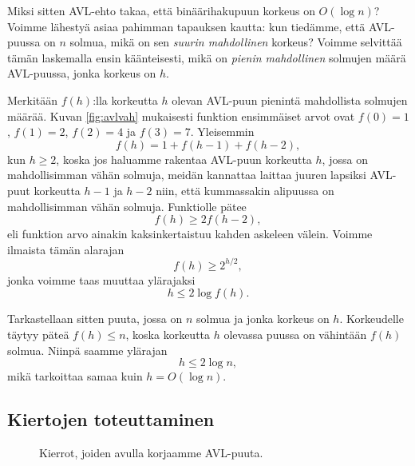Miksi sitten AVL-ehto takaa, että binäärihakupuun korkeus
on $O(\log n)$?
Voimme lähestyä asiaa pahimman tapauksen kautta:
kun tiedämme, että AVL-puussa on $n$ solmua,
mikä on sen \emph{suurin mahdollinen} korkeus?
Voimme selvittää tämän laskemalla ensin käänteisesti,
mikä on \emph{pienin mahdollinen} solmujen määrä
AVL-puussa, jonka korkeus on $h$.

Merkitään $f(h)$:lla korkeutta $h$ olevan AVL-puun
pienintä mahdollista solmujen määrää.
Kuvan \ref{fig:avlvah} mukaisesti funktion ensimmäiset arvot
ovat $f(0)=1$, $f(1)=2$, $f(2)=4$ ja $f(3)=7$.
Yleisemmin
\[f(h)=1+f(h-1)+f(h-2),\]
kun $h \ge 2$, koska jos haluamme rakentaa AVL-puun korkeutta $h$,
jossa on mahdollisimman vähän solmuja,
meidän kannattaa laittaa juuren lapsiksi AVL-puut
korkeutta $h-1$ ja $h-2$ niin,
että kummassakin alipuussa on mahdollisimman vähän solmuja.
Funktiolle pätee
\[f(h) \ge 2 f(h-2),\]
eli funktion arvo ainakin kaksinkertaistuu kahden askeleen välein.
Voimme ilmaista tämän alarajan
\[f(h) \ge 2^{h/2},\]
jonka voimme taas muuttaa ylärajaksi
\[ h \le 2 \log f(h).\]

Tarkastellaan sitten puuta, jossa on $n$ solmua
ja jonka korkeus on $h$.
Korkeudelle täytyy päteä $f(h) \le n$,
koska korkeutta $h$ olevassa puussa on vähintään $f(h)$ solmua.
Niinpä saamme ylärajan
\[h \le 2 \log n,\]
mikä tarkoittaa samaa kuin $h = O(\log n)$.

\subsection{Kiertojen toteuttaminen}

\begin{figure}
\center
{}
\caption{Kierrot, joiden avulla korjaamme AVL-puuta.}
\label{fig:avlkie}
\end{figure}


